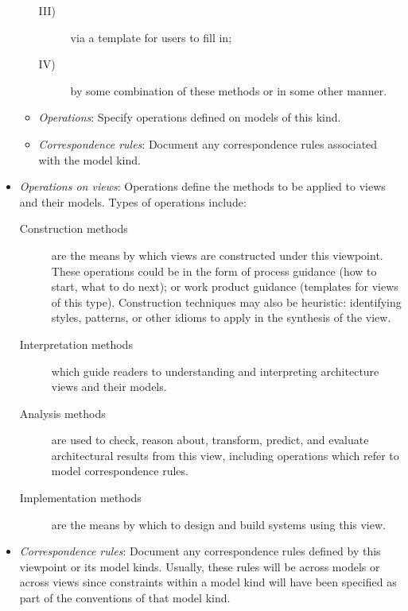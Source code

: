 \begin{itemize}
\begin{itemize}
\begin{description}
\item[III)] via a template for users to fill in;
\item[IV)] by some combination of these methods or in some other
  manner.
\end{description}
\item {\em Operations}: Specify operations defined on models of this kind.
\item {\em Correspondence rules}: Document any correspondence rules associated with the model
  kind.
\end{itemize}
\item {\em Operations on views}: Operations define the methods to be applied to views and their models.
Types of operations include:
\begin{description}
\item[Construction methods] are the means by which views are
  constructed under this viewpoint. These operations could be in the
  form of process guidance (how to start, what to do next); or work
  product guidance (templates for views of this type). Construction
  techniques may also be heuristic: identifying styles, patterns, or
  other idioms to apply in the synthesis of the view.
\item[Interpretation methods] which guide readers to understanding
  and interpreting architecture views and their models.
\item[Analysis methods] are used to check, reason about, transform,
  predict, and evaluate architectural results from this view,
  including operations which refer to model correspondence rules.
\item[Implementation methods] are the means by which to design and
  build systems using this view.
\end{description}
\item {\em Correspondence rules}: 
Document any correspondence rules defined by this viewpoint or
  its model kinds.
Usually, these rules will be across models or across views since
constraints within a model kind will have been specified as part of
the conventions of that model kind.

\end{itemize}
